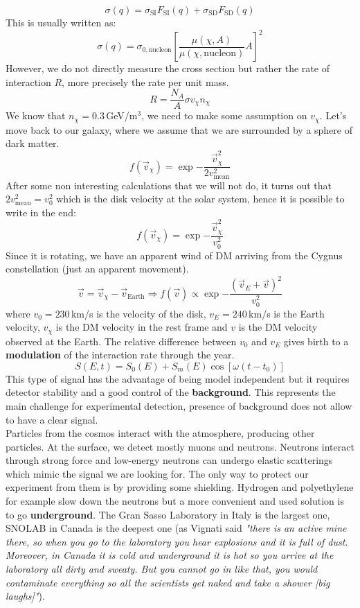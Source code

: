 \documentclass[10.75pt,a4paper,openright,bottom=2cm]{article}
\begin{document}
\[
\sigma(q)=\sigma_{\text{SI}}F_{\text{SI}}(q)+\sigma_{\text{SD}}F_{\text{SD}}(q)
\]
This is usually written as:
\[
\sigma(q)=\sigma_{0,\text{nucleon}}\left[\frac{\mu(\chi,A)}{\mu(\chi,\text{nucleon})}A\right]^2
\]
However, we do not directly measure the cross section but rather the rate of interaction $R$, more precisely the rate per unit mass.
\[
R=\frac{N_A}{A}\sigma v_\chi n_\chi
\]
We know that $n_\chi=0.3$\,GeV/m$^3$, we need to make some assumption on $v_\chi$. Let's move back to our galaxy, where we assume that we are surrounded by a sphere of dark matter.
\[
f(\Vec{v}_\chi)=\exp{-\frac{\Vec{v}_\chi^2}{2v_{\text{mean}}^2}}
\]
After some non interesting calculations that we will not do, it turns out that $2v_{\text{mean}}^2=v_0^2$ which is the disk velocity at the solar system, hence it is possible to write in the end:
\[
f(\Vec{v}_\chi)=\exp{-\frac{\Vec{v}_\chi^2}{v_0^2}}
\]
Since it is rotating, we have an apparent wind of DM arriving from the Cygnus constellation (just an apparent movement).
\[
\Vec{v}=\Vec{v}_\chi-\Vec{v}_{\text{Earth}}\Rightarrow f(\Vec{v})\propto\exp{-\frac{(\Vec{v}_E+\Vec{v})^2}{v_0^2}}
\]
where $v_0=230$\,km/s is the velocity of the disk, $v_E=240$\,km/s is the Earth velocity, $v_\chi$ is the DM velocity in the rest frame and $v$ is the DM velocity observed at the Earth. The relative difference between $v_0$ and $v_E$ gives birth to a \textbf{modulation} of the interaction rate through the year.
\[
S(E,t)=S_0(E)+S_m(E)\cos[\omega(t-t_0)]
\]
This type of signal has the advantage of being model independent but it requires detector stability and a good control of the \textbf{background}. This represents the main challenge for experimental detection, presence of background does not allow to have a clear signal.\\
Particles from the cosmos interact with the atmosphere, producing other particles. At the surface, we detect mostly muons and neutrons. Neutrons interact through strong force and low-energy neutrons can undergo elastic scatterings which mimic the signal we are looking for. The only way to protect our experiment from them is by providing some shielding. Hydrogen and polyethylene for example slow down the neutrons but a more convenient and used solution is to go \textbf{underground}. The Gran Sasso Laboratory in Italy is the largest one, SNOLAB in Canada is the deepest one (as Vignati said \textit{"there is an active mine there, so when you go to the laboratory you hear explosions and it is full of dust. Moreover, in Canada it is cold and underground it is hot so you arrive at the laboratory all dirty and sweaty. But you cannot go in like that, you would contaminate everything so all the scientists get naked and take a shower [big laughs]"}).\\
\end{document}
